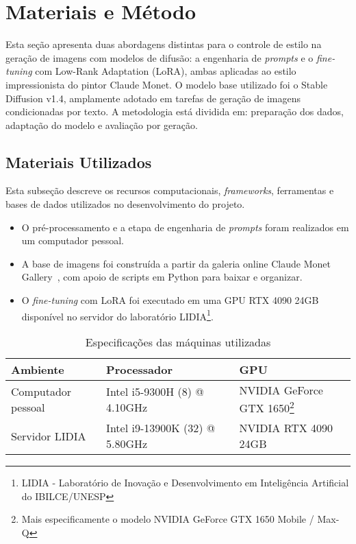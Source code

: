 \section{Materiais e Método}

Esta seção apresenta duas abordagens distintas para o controle de estilo na geração de imagens com modelos de difusão: a engenharia de \textit{prompts} e o \textit{fine-tuning} com Low-Rank Adaptation (LoRA)\cite{lora}, ambas aplicadas ao estilo impressionista do pintor Claude Monet. O modelo base utilizado foi o Stable Diffusion v1.4\cite{stablediff}, amplamente adotado em tarefas de geração de imagens condicionadas por texto. A metodologia está dividida em: preparação dos dados, adaptação do modelo e avaliação por geração.

\subsection{Materiais Utilizados}

Esta subseção descreve os recursos computacionais, \textit{frameworks}, ferramentas e bases de dados utilizados no desenvolvimento do projeto.

\begin{itemize}
\item O pré-processamento e a etapa de engenharia de \textit{prompts} foram realizados em um computador pessoal.
\item A base de imagens foi construída a partir da galeria online Claude Monet Gallery~\cite{cmgallery}, com apoio de scripts em Python para baixar e organizar.
\item O \textit{fine-tuning} com LoRA foi executado em uma GPU RTX 4090 24GB disponível no servidor do laboratório LIDIA\footnote{LIDIA - Laboratório de Inovação e Desenvolvimento em Inteligência Artificial do IBILCE/UNESP}.
\end{itemize}

\begin{table}[htb]
\caption{Especificações das máquinas utilizadas}
\label{tab:maquinas}

        \begin{tabular}{lll}
        \hline
        Ambiente            & Processador                        & GPU                                    \\ \hline
        Computador pessoal  & Intel i5-9300H (8) @ 4.10GHz       & NVIDIA GeForce GTX 1650\footnote{Mais especificamente o modelo NVIDIA GeForce GTX 1650 Mobile / Max-Q} \\ \hline
        Servidor LIDIA      & Intel i9-13900K (32) @ 5.80GHz     & NVIDIA RTX 4090 24GB                   \\ \hline
        \end{tabular}

\end{table}


